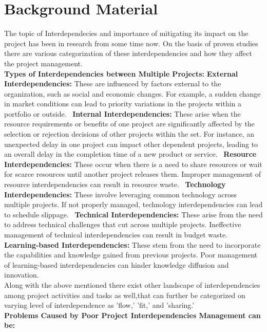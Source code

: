 \documentclass{llncs}
\begin{document}
\section{Background Material}
The topic of Interdependecies and importance of mitigating its impact on the project has been in research from some time now. On the basis of proven studies there are various categorization of these interdependencies and how they affect the project management. \\
\textbf{Types of Interdependencies between Multiple Projects:}
\subitem \textbf{External Interdependencies:} These are influenced by factors external to the organization, such as social and economic changes. For example, a sudden change in market conditions can lead to priority variations in the projects within a portfolio or outside.~\cite{refpaper2}
\subitem \textbf{Internal Interdependencies:} These arise when the resource requirements or benefits of one project are significantly affected by the selection or rejection decisions of other projects within the set. For instance, an unexpected delay in one project can impact other dependent projects, leading to an overall delay in the completion time of a new product or service.~\cite{refpaper2}
\subitem \textbf{Resource Interdependencies:} These occur when there is a need to share resources or wait for scarce resources until another project releases them. Improper management of resource interdependencies can result in resource waste.~\cite{refpaper2}
\subitem\textbf{Technology Interdependencies:} These involve leveraging common technology across multiple projects. If not properly managed, technology interdependencies can lead to schedule slippage.~\cite{refpaper2}
\subitem \textbf{Technical Interdependencies:} These arise from the need to address technical challenges that cut across multiple projects. Ineffective management of technical interdependencies can result in budget waste. \subitem\textbf{Learning-based Interdependencies:} These stem from the need to incorporate the capabilities and knowledge gained from previous projects. Poor management of learning-based interdependencies can hinder knowledge diffusion and innovation.~\cite{refpaper2} \\
Along with the above mentioned there exist other landscape of interdependencies among project activities and tasks as well,that can further be categorized on varying level of interdependence as  'flow,' 'fit,' and 'sharing.'~\cite{refpaper5} \\
\textbf{Problems Caused by Poor Project Interdependencies Management can be:}
\end{document}

